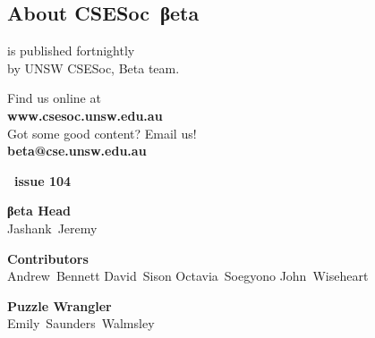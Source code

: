 \documentclass[twoside]{article}
\date{30 March 2015}
\makeatletter
\gdef\the@year{2015}
\gdef\the@issue{104}
\makeatother
\begin{document}
%
\newpage
\maketitle
\begingroup\begin{multicols}{2}
\section*{About CSE{}Soc~βeta}\begin{center}
\csesocbeta{} is published fortnightly\\
by UNSW CSESoc, Beta team.
\par Find us online at\\
\textbf{www.csesoc.unsw.edu.au}\\
Got some good content? Email us!\\
\textbf{beta@cse.unsw.edu.au}\\
\vspace{1em}\par
{\Large\bf\makeatletter \the@year\ issue \the@issue}
\par{\bf\sffamily βeta Head}\\ Jashank~Jeremy
\par{\bf\sffamily Contributors}\\
  Andrew~Bennett\hsp{}
  David~Sison\hsp{}
  Octavia~Soegyono\hsp{}
  John~Wiseheart\hsp{}
\par{\bf\sffamily Puzzle Wrangler}\\ Emily~Saunders~Walmsley
\end{center}

\columnbreak
\malcontents\thispagestyle{mag} \vfill\raggedcolumns
\end{multicols}
\endgroup

\begin{multicols}{2}

\end{multicols}
\end{document}
